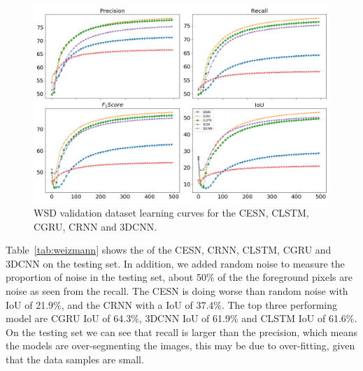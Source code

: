 \documentclass{WitsPhysicsReport}
\begin{document}
\begin{figure}[H]
\centering
  \includegraphics[width=1\textwidth]{Figure/Results/WEIZMANN_performance.png}
 \caption{WSD validation dataset learning curves for the CESN, CLSTM, CGRU, CRNN and 3DCNN.}
 \label{fig:WEIZMANN_model_perfomance}
\end{figure}

Table~\ref{tab:weizmann} shows the of the CESN, CRNN, CLSTM, CGRU and 3DCNN on the testing set. In addition, we added random noise to measure the proportion of noise in the testing set, about 50\% of the the foreground pixels are noise as seen from the recall. The CESN is doing worse than random noise with IoU of 21.9\%, and the CRNN with a  IoU of 37.4\%. The top three performing model are CGRU IoU of 64.3\%, 3DCNN IoU of 61.9\% and CLSTM IoU of 61.6\%. On the testing set we can see that recall is larger than the precision, which means the models are over-segmenting the images, this may be due to over-fitting, given that the data samples are small.
 

\begin{table}[H]
\centering
 \caption{WSD testing set results. Here we compare various models and noise is also included.}
    \label{tab:weizmann}
\end{table}
\end{document}
